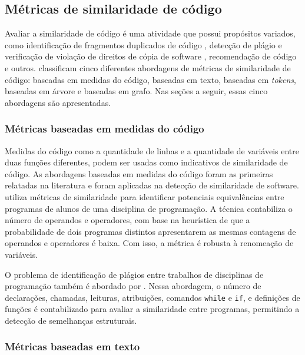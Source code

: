 \subsection{Métricas de similaridade de código}

Avaliar a similaridade de código é uma atividade que possui propósitos variados, como identificação de fragmentos duplicados de código \cite{roy:etal:2008}, detecção de plágio e verificação de violação de direitos de cópia de software \cite{ottenstein:1976}, recomendação de código \cite{holmes:etal:2005} e outros.  classificam cinco diferentes abordagens de métricas de similaridade de código: baseadas em medidas do código, baseadas em texto, baseadas em \textit{tokens}, baseadas em árvore e baseadas em grafo. Nas seções a seguir, essas cinco abordagens são apresentadas.

\subsubsection{Métricas baseadas em medidas do código}

Medidas do código como a quantidade de linhas e a quantidade de variáveis entre duas funções diferentes, podem ser usadas como indicativos de similaridade de código. As abordagens baseadas em medidas do código foram as primeiras relatadas na literatura e foram aplicadas na detecção de similaridade de software.  utiliza métricas de similaridade para identificar potenciais equivalências entre programas de alunos de uma disciplina de programação. A técnica contabiliza o número de operandos e operadores, com base na heurística de que a probabilidade de dois programas distintos apresentarem as mesmas contagens de operandos e operadores é baixa. Com isso, a métrica é robusta à renomeação de variáveis.

O problema de identificação de plágios entre trabalhos de disciplinas de programação também é abordado por . Nessa abordagem, o número de declarações, chamadas, leituras, atribuições, comandos \texttt{while} e \texttt{if}, e definições de funções é contabilizado para avaliar a similaridade entre programas, permitindo a detecção de semelhanças estruturais.

\subsubsection{Métricas baseadas em texto}


